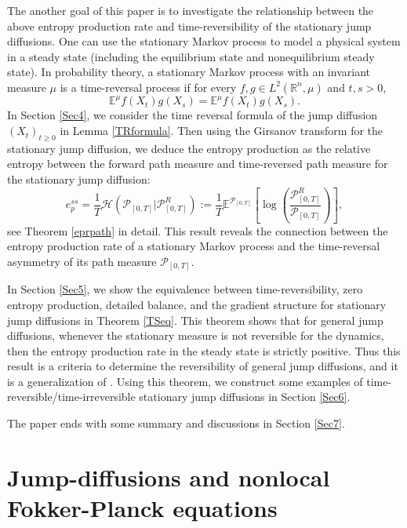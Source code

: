 \documentclass[10pt]{article}
\theoremstyle{definition}
\theoremstyle{remark}
\numberwithin{equation}{section}
\begin{document}
The another goal of this paper is to investigate the relationship between the above entropy production rate  and time-reversibility of the stationary jump diffusions.
One can use the stationary Markov process to model a physical system in a steady state (including the equilibrium state and nonequilibrium steady state).
In probability theory, a stationary Markov process with an invariant measure $\mu$ is a time-reversal process if for every $f,g\in L^2(\mathbb{R}^n, \mu)$ and $t,s >0$,
\begin{equation*}
    \mathbb{E}^{\mu}f(X_t)g(X_s) = \mathbb{E}^{\mu}f(X_t)g(X_s).
\end{equation*} 
In Section \ref{Sec4}, we consider the time reversal formula of the jump diffusion $(X_t)_{t\geq 0}$ in Lemma \ref{TRformula}.
Then using the Girsanov transform for the stationary jump diffusion, we deduce the entropy production as the relative entropy between the forward path measure and time-reversed path measure for the stationary jump diffusion:
\begin{equation*}
    e^{ss}_p = \frac{1}{T}\mathcal{H}(\mathcal{P}_{[0,T]} | \mathcal{P}^R_{[0,T]}) := \frac{1}{T}\mathbb{E}^{\mathcal{P}_{[0,T]}} \left[ \log \left(\frac{\mathcal{P}^R_{[0,T]}}{\mathcal{P}_{[0,T]}}\right) \right],
\end{equation*}
see Theorem \ref{eprpath} in detail. This result reveals the connection between the entropy production rate of a stationary Markov process and the time-reversal asymmetry of its path measure $\mathcal{P}_{[0,T]}$.


In Section \ref{Sec5}, we show the equivalence between time-reversibility, zero entropy production, detailed balance, and the gradient structure for stationary jump diffusions in Theorem \ref{TSeq}. {This theorem shows that for general jump diffusions, whenever the stationary measure is not reversible for the dynamics, then the entropy production rate in the steady state is strictly positive. Thus this result is a criteria to determine the reversibility of general jump diffusions, and it is a generalization of \cite{QQT02,MRV02}.} Using this theorem, we construct some examples of time-reversible/time-irreversible stationary jump diffusions in Section \ref{Sec6}.

The paper ends with some summary and discussions in Section \ref{Sec7}.


\section{Jump-diffusions and nonlocal Fokker-Planck equations}\label{Sec2}
\end{document}
